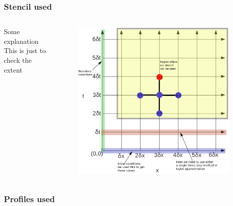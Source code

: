 \documentclass[hyperref={bookmarks=false},aspectratio=169]{beamer}
\begin{document}
\begin{frame}
  \frametitle{Stencil used}
  \begin{columns}
    Some explanation This is just to check the extent
    \begin{figure}[hbt!]
      \centering
      \includegraphics[width=.75\textwidth]{images/labelled_grid.eps}
    \end{figure}
  \end{columns}

\end{frame}

\begin{frame}
  \frametitle{Profiles used}

\end{frame}
\end{document}

